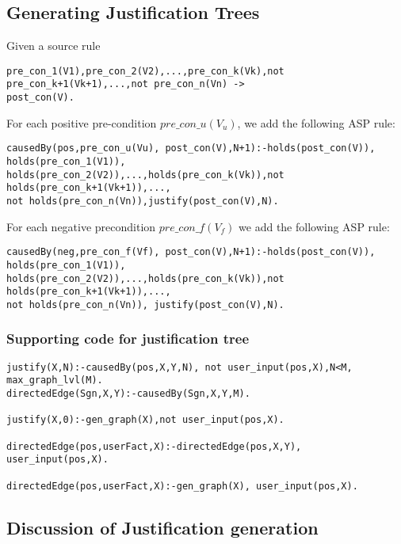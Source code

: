 \subsection{Generating Justification Trees}

Given a source rule 
\begin{lstlisting}[frame=none]
pre_con_1(V1),pre_con_2(V2),...,pre_con_k(Vk),not pre_con_k+1(Vk+1),...,not pre_con_n(Vn) -> 
post_con(V).
\end{lstlisting}

For each positive pre-condition $pre\_con\_u(V_{u})$, we add the following ASP rule:

\begin{lstlisting}[frame=none]
causedBy(pos,pre_con_u(Vu), post_con(V),N+1):-holds(post_con(V)), holds(pre_con_1(V1)),
holds(pre_con_2(V2)),...,holds(pre_con_k(Vk)),not holds(pre_con_k+1(Vk+1)),...,
not holds(pre_con_n(Vn)),justify(post_con(V),N).   
\end{lstlisting}
For each negative precondition $pre\_con\_f(V_{f})$ we add the following ASP rule: 
\begin{lstlisting}[frame=none]
causedBy(neg,pre_con_f(Vf), post_con(V),N+1):-holds(post_con(V)), holds(pre_con_1(V1)),
holds(pre_con_2(V2)),...,holds(pre_con_k(Vk)),not holds(pre_con_k+1(Vk+1)),...,
not holds(pre_con_n(Vn)), justify(post_con(V),N).
\end{lstlisting}

\subsubsection{Supporting code for justification tree}
\mbox{}

\begin{lstlisting}[frame=none]
justify(X,N):-causedBy(pos,X,Y,N), not user_input(pos,X),N<M, max_graph_lvl(M).
directedEdge(Sgn,X,Y):-causedBy(Sgn,X,Y,M).

justify(X,0):-gen_graph(X),not user_input(pos,X).

directedEdge(pos,userFact,X):-directedEdge(pos,X,Y), user_input(pos,X).

directedEdge(pos,userFact,X):-gen_graph(X), user_input(pos,X).
\end{lstlisting}

\subsection{Discussion of Justification generation}

